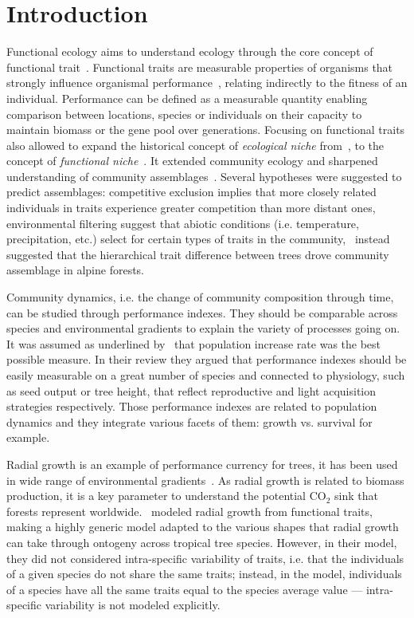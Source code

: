 \label{sec:Intro}
\section*{Introduction}
Functional ecology aims to understand ecology through the core concept of functional trait~\citep{mcgill_rebuilding_2006}. Functional traits are measurable properties of organisms that strongly influence organismal performance~\citep{mcgill_rebuilding_2006}, relating indirectly to the fitness of an individual. Performance can be defined as a measurable quantity enabling comparison between locations, species or individuals on their capacity to maintain biomass or the gene pool over generations. Focusing on functional traits also allowed to expand the historical concept of \emph{ecological niche} from~\citet{hutchinson_concluding_1957}, to the concept of \emph{functional niche}~\citep{violle_towards_2009}. It extended community ecology and sharpened understanding of community assemblages~\citep{kraft_functional_2010}. Several hypotheses were suggested to predict assemblages: competitive exclusion implies that more closely related individuals in traits experience greater competition than more distant ones, environmental filtering suggest that abiotic conditions (i.e. temperature, precipitation, etc.) select for certain types of traits in the community,~\citet{kunstler_competitive_2012} instead suggested that the hierarchical trait difference between trees drove community assemblage in alpine forests.

Community dynamics, i.e. the change of community composition through time, can be studied through performance indexes. They should be comparable across species and environmental gradients to explain the variety of processes going on. It was assumed as underlined by~\citet{mcgill_rebuilding_2006} that population increase rate was the best possible measure. In their review they argued that performance indexes should be easily measurable on a great number of species	and connected to physiology, such as seed output or tree height, that reflect reproductive and light acquisition strategies respectively. Those performance indexes are related to population dynamics and they integrate various facets of them: growth vs. survival for example.

Radial growth is an example of performance currency for trees, it has been used in wide range of environmental gradients~\citep{herault_functional_2011, kunstler_competitive_2012}. As radial growth is related to biomass production, it is a key parameter to understand the potential $\text{CO}_2$ sink that forests represent worldwide.~\citet{herault_functional_2011} modeled radial growth from functional traits, making a highly generic model adapted to the various shapes that radial growth can take through ontogeny across tropical tree species. However, in their model, they did not considered intra-specific variability of traits, i.e. that the individuals of a given species do not share the same traits; instead, in the model, individuals of a species have all the same traits equal to the species average value — intra-specific variability is not modeled explicitly.	
\vspace{-\parskip}

